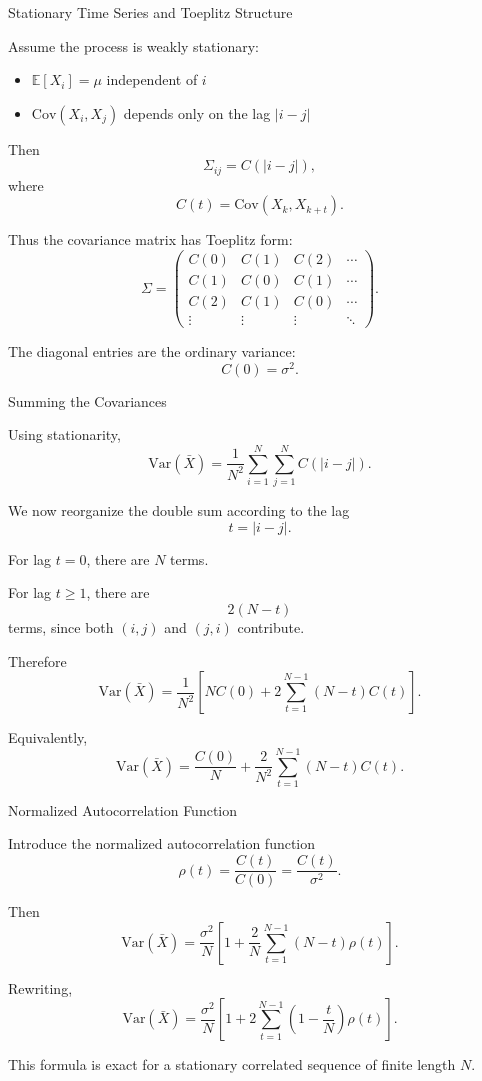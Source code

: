 \documentclass{beamer}
\begin{document}
\begin{frame}{Stationary Time Series and Toeplitz Structure}

Assume the process is weakly stationary:

\begin{itemize}
\item $\mathbb{E}[X_i]=\mu$ independent of $i$
\item $\mathrm{Cov}(X_i,X_j)$ depends only on the lag $|i-j|$
\end{itemize}

Then
\[
\Sigma_{ij} = C(|i-j|),
\]
where
\[
C(t)=\mathrm{Cov}(X_k,X_{k+t}).
\]

Thus the covariance matrix has Toeplitz form:
\[
\Sigma =
\begin{pmatrix}
C(0) & C(1) & C(2) & \cdots \\
C(1) & C(0) & C(1) & \cdots \\
C(2) & C(1) & C(0) & \cdots \\
\vdots & \vdots & \vdots & \ddots
\end{pmatrix}.
\]

The diagonal entries are the ordinary variance:
\[
C(0)=\sigma^2.
\]
\end{frame}

\begin{frame}{Summing the Covariances}

Using stationarity,
\[
\mathrm{Var}(\bar X)
=
\frac{1}{N^2}\sum_{i=1}^N\sum_{j=1}^N C(|i-j|).
\]

We now reorganize the double sum according to the lag
\[
t = |i-j|.
\]

For lag $t=0$, there are $N$ terms.

For lag $t\ge 1$, there are
\[
2(N-t)
\]
terms, since both $(i,j)$ and $(j,i)$ contribute.

Therefore
\[
\mathrm{Var}(\bar X)
=
\frac{1}{N^2}
\left[
N C(0) + 2\sum_{t=1}^{N-1}(N-t)C(t)
\right].
\]

Equivalently,
\[
\mathrm{Var}(\bar X)
=
\frac{C(0)}{N}
+
\frac{2}{N^2}\sum_{t=1}^{N-1}(N-t)C(t).
\]
\end{frame}

\begin{frame}{Normalized Autocorrelation Function}

Introduce the normalized autocorrelation function
\[
\rho(t)=\frac{C(t)}{C(0)}=\frac{C(t)}{\sigma^2}.
\]

Then
\[
\mathrm{Var}(\bar X)
=
\frac{\sigma^2}{N}
\left[
1+\frac{2}{N}\sum_{t=1}^{N-1}(N-t)\rho(t)
\right].
\]

Rewriting,
\[
\mathrm{Var}(\bar X)
=
\frac{\sigma^2}{N}
\left[
1+2\sum_{t=1}^{N-1}\left(1-\frac{t}{N}\right)\rho(t)
\right].
\]

This formula is exact for a stationary correlated sequence of finite length $N$.
\end{frame}
\end{document}
